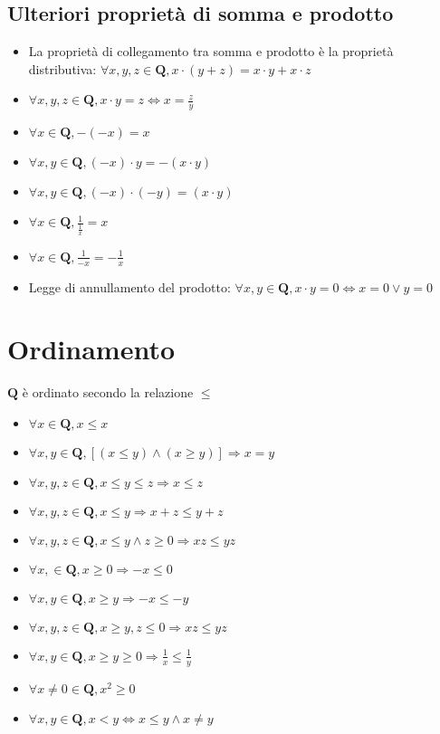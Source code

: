 \subsection{Ulteriori propriet\`a di somma e prodotto}
\begin{itemize}
\item La propriet\`a di collegamento tra somma e prodotto \`e la propriet\`a distributiva: $\forall x, y, z \in \mathbf{Q}, x\cdot(y + z)=x\cdot y+x\cdot z$
\item $\forall x, y, z \in \mathbf{Q}, x\cdot y=z \Leftrightarrow x=\frac{z}{y}$
\item $\forall x \in \mathbf{Q}, -(-x)=x$
\item $\forall x, y \in \mathbf{Q}, (-x)\cdot y=-(x \cdot y)$
\item $\forall x, y \in \mathbf{Q}, (-x)\cdot (-y)=(x \cdot y)$
\item $\forall x \in \mathbf{Q}, \frac{1}{\frac{1}{x}}=x$
\item $\forall x \in \mathbf{Q}, \frac{1}{-x}=-\frac{1}{x}$
\item Legge di annullamento del prodotto: $\forall x, y \in \mathbf{Q}, x\cdot y=0 \Leftrightarrow x=0 \lor y=0 $
\end{itemize}
\section{Ordinamento}
$\mathbf{Q}$ \`e ordinato secondo la relazione $\le$
\begin{itemize}
\item $\forall x\in \mathbf{Q}, x\le x$
\item $\forall x, y\in \mathbf{Q},[(x\le y)\wedge(x\ge y)] \Rightarrow x=y$
\item $\forall x, y, z\in \mathbf{Q}, x\le y\le z \Rightarrow x\le z$
\item $\forall x, y, z \in \mathbf{Q}, x\le y \Rightarrow x+z\le y+z$
\item $\forall x, y, z \in \mathbf{Q}, x\le y \wedge z\ge 0 \Rightarrow xz\le yz$
\item $\forall x, \in \mathbf{Q}, x\ge 0 \Rightarrow -x\le 0$
\item $\forall x, y\in \mathbf{Q}, x\ge y \Rightarrow -x\le -y$
\item $\forall x, y, z \in \mathbf{Q},x\ge y, z\le 0 \Rightarrow xz\le yz$
\item $\forall x, y \in \mathbf{Q}, x\ge y \ge 0 \Rightarrow \frac{1}{x}\le\frac{1}{y}$
\item $\forall x\ne 0 \in \mathbf{Q}, x^2\ge 0$
\item $\forall x, y \in \mathbf{Q}, x<y \Leftrightarrow x \le y \wedge x\ne y$
\end{itemize}

